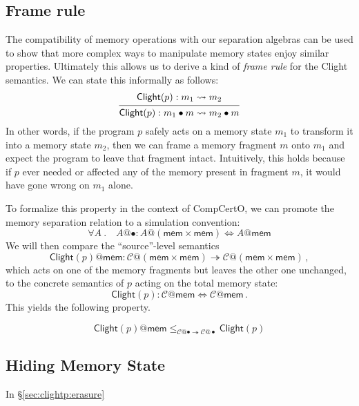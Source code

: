 \documentclass[acmsmall,screen,review,anonymous]{acmart}
\newcommand{\kw}[1]{\ensuremath{ \mathsf{#1} }}
\newcommand{\Clight}{\ensuremath{ \mathsf{Clight} }}
\begin{document}

\subsection{Frame rule} %

The compatibility of memory operations with our separation algebras
can be used to show that
more complex ways to manipulate memory states
enjoy similar properties.
Ultimately this allows us to derive
a kind of \emph{frame rule} for the Clight semantics.
We can state this informally as follows:
\[
  \begin{prooftree}
    \hypo{\Clight(p) : m_1 \leadsto m_2}
    \infer1{\Clight(p) : m_1 \bullet m \leadsto m_2 \bullet m}
  \end{prooftree}
\]
In other words,
if the program $p$ safely acts on a memory state $m_1$
to transform it into a memory state $m_2$,
then we can frame a memory fragment $m$ onto $m_1$
and expect the program to leave that fragment intact.
Intuitively, this holds because
if $p$ ever needed or affected any of the memory present
in fragment $m$,
it would have gone wrong on $m_1$ alone.

To formalize this property in the context of CompCertO,
we can promote the memory separation relation
to a simulation convention:
\[
  \forall A \:.\quad
  A@{\bullet} : A@(\kw{mem} \times \kw{mem}) \Leftrightarrow A@\kw{mem}
\]
We will then compare the ``source''-level semantics
\[
  \Clight(p)@\kw{mem} :
    \mathcal{C}@(\kw{mem} \times \kw{mem}) \twoheadrightarrow
    \mathcal{C}@(\kw{mem} \times \kw{mem})
  \,,
\]
which acts on one of the memory fragments
but leaves the other one unchanged,
to the concrete semantics of $p$ acting on the total memory state:
\[
  \Clight(p) : \mathcal{C}@\kw{mem} \Leftrightarrow \mathcal{C}@\kw{mem}
  \,.
\]
This yields the following property.

\begin{lemma}
\[
  \Clight(p)@\kw{mem}
  \le_{\mathcal{C}@{\bullet} \twoheadrightarrow \mathcal{C}@{\bullet}}
  \Clight(p)
\]
\end{lemma}


\subsection{Hiding Memory State} %

In \S\ref{sec:clightp:erasure}


\end{document}
